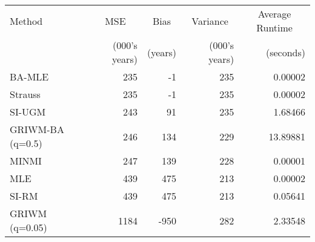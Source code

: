 
\begin{tabular}{lrrrr}
\toprule
\multicolumn{1}{l}{Method} & \multicolumn{1}{c}{MSE} & \multicolumn{1}{c}{Bias} & \multicolumn{1}{c}{Variance} & \multicolumn{1}{c}{Average Runtime} \\
 & (000's years) & (years) & (000's years) & (seconds)\\
\midrule
BA-MLE & 235 & -1 & 235 & 0.00002\\
Strauss & 235 & -1 & 235 & 0.00002\\
SI-UGM & 243 & 91 & 235 & 1.68466\\
GRIWM-BA (q=0.5) & 246 & 134 & 229 & 13.89881\\
MINMI & 247 & 139 & 228 & 0.00001\\
\addlinespace
MLE & 439 & 475 & 213 & 0.00002\\
SI-RM & 439 & 475 & 213 & 0.05641\\
GRIWM (q=0.05) & 1184 & -950 & 282 & 2.33548\\
\bottomrule
\end{tabular}
